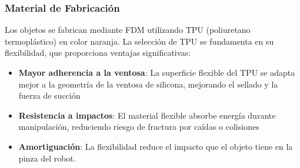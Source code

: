 \subsubsection{Material de Fabricación}

Los objetos se fabrican mediante FDM utilizando TPU (poliuretano termoplástico) en color naranja. La selección de TPU se fundamenta en su flexibilidad, que proporciona ventajas significativas:

\begin{itemize}
    \item \textbf{Mayor adherencia a la ventosa}: La superficie flexible del TPU se adapta mejor a la geometría de la ventosa de silicona, mejorando el sellado y la fuerza de succión
    \item \textbf{Resistencia a impactos}: El material flexible absorbe energía durante manipulación, reduciendo riesgo de fractura por caídas o colisiones
    \item \textbf{Amortiguación}: La flexibilidad reduce el impacto que el  objeto tiene en la pinza del robot.
\end{itemize}
